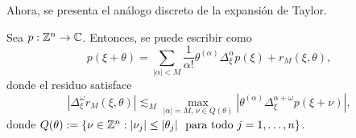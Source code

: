 Ahora, se presenta el análogo discreto de la expansión de Taylor.
\begin{theorem}
	Sea $p:\mathbb{Z}^n\to\mathbb{C}$. Entonces, se puede escribir como 
	\begin{equation*}
		p(\xi + \theta) = \sum_{|\alpha|<M} \frac{1}{\alpha!} \theta^{(\alpha)} \Delta^\alpha_\xi p(\xi) + r_M(\xi, \theta),
	\end{equation*}
	donde el residuo satisface
	\begin{equation*}
		|\Delta^\omega_\xi r_M(\xi, \theta)| \lesssim_M \max_{|\alpha|=M,\, \nu \in Q(\theta)} |\theta^{(\alpha)}\Delta^{\alpha+\omega}_\xi p(\xi+\nu)|,
	\end{equation*}
	donde $Q(\theta) := \{\nu\in\mathbb{Z}^n :|\nu_j|\leq|\theta_j|\,\, \text{ para todo } j=1,\ldots,n\}$.
\end{theorem}
